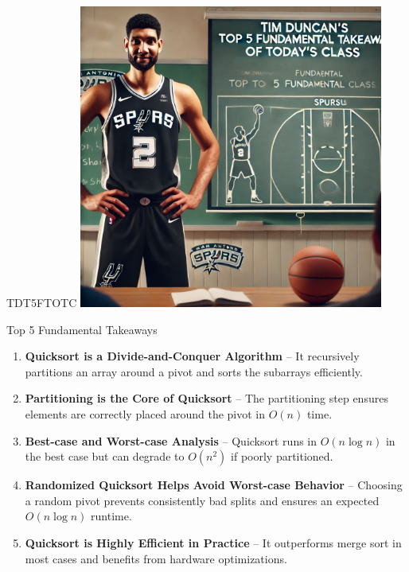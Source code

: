 \documentclass{beamer}
\begin{document}
\begin{frame}{TDT5FTOTC}
    \centering
    \includegraphics[width=0.75\textwidth]{figures/tim.png}
\end{frame}

\begin{frame}{Top 5 Fundamental Takeaways}
    \small
    \begin{enumerate} \pause
        \item[5] \textbf{Quicksort is a Divide-and-Conquer Algorithm} – It recursively partitions an array around a pivot and sorts the subarrays efficiently.\pause

        \item[4] \textbf{Partitioning is the Core of Quicksort} – The partitioning step ensures elements are correctly placed around the pivot in $O(n)$ time.\pause

        \item[3] \textbf{Best-case and Worst-case Analysis} – Quicksort runs in $O(n \log n)$ in the best case but can degrade to $O(n^2)$ if poorly partitioned.\pause

        \item[2] \textbf{Randomized Quicksort Helps Avoid Worst-case Behavior} – Choosing a random pivot prevents consistently bad splits and ensures an expected $O(n \log n)$ runtime.\pause

        \item[1] \textbf{Quicksort is Highly Efficient in Practice} – It outperforms merge sort in most cases and benefits from hardware optimizations.

    \end{enumerate}
\end{frame}
\end{document}
